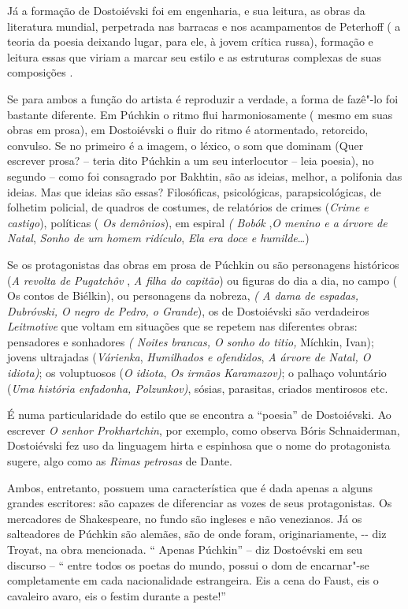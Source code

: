 Já a formação de Dostoiévski foi em engenharia, e sua leitura, as obras
da literatura mundial, perpetrada nas barracas e nos acampamentos de
Peterhoff ( a teoria da poesia deixando lugar, para ele, à jovem crítica
russa), formação e leitura essas que viriam a marcar seu estilo e as
estruturas complexas de suas composições .

Se para ambos a função do artista é reproduzir a verdade, a forma de
fazê"-lo foi bastante diferente. Em Púchkin o ritmo flui harmoniosamente
( mesmo em suas obras em prosa), em Dostoiévski o fluir do ritmo é
atormentado, retorcido, convulso. Se no primeiro é a imagem, o léxico, o
som que dominam (Quer escrever prosa? -- teria dito Púchkin a um seu
interlocutor -- leia poesia), no segundo -- como foi consagrado por
Bakhtin, são as ideias, melhor, a polifonia das ideias. Mas que ideias
são essas? Filosóficas, psicológicas, parapsicológicas, de folhetim
policial, de quadros de costumes, de relatórios de crimes (\emph{Crime e
castigo}), políticas ( \emph{Os demônios}), em espiral \emph{( Bobók}
,\emph{O menino e a árvore de Natal}, \emph{Sonho de um homem ridículo},
\emph{Ela era doce e humilde}\ldots{})

Se os protagonistas das obras em prosa de Púchkin ou são personagens
históricos (\emph{A revolta de Pugatchôv} , \emph{A filha do}
\emph{capitão}) ou figuras do dia a dia, no campo ( Os contos de
Biélkin), ou personagens da nobreza, \emph{( A dama de espadas,
Dubróvski, O negro de Pedro, o Grande}), os de Dostoiévski são
verdadeiros \emph{Leitmotive} que voltam em situações que se repetem nas
diferentes obras: pensadores e sonhadores \emph{( Noites brancas, O
sonho do titio,} Míchkin, Ivan); jovens ultrajadas (\emph{Várienka},
\emph{Humilhados e ofendidos}, \emph{A árvore de Natal, O idiota)}; os
voluptuosos (\emph{O idiota}, \emph{Os irmãos Karamazov)}; o palhaço
voluntário (\emph{Uma história enfadonha, Polzunkov)}, sósias,
parasitas, criados mentirosos etc.

É numa particularidade do estilo que se encontra a ``poesia'' de
Dostoiévski. Ao escrever \emph{O senhor Prokhartchin}, por exemplo, como
observa Bóris Schnaiderman, Dostoiévski fez uso da linguagem hirta e
espinhosa que o nome do protagonista sugere, algo como as \emph{Rimas
petrosas} de Dante.

Ambos, entretanto, possuem uma característica que é dada apenas a alguns
grandes escritores: são capazes de diferenciar as vozes de seus
protagonistas. Os mercadores de Shakespeare, no fundo são ingleses e não
venezianos. Já os salteadores de Púchkin são alemães, são de onde foram,
originariamente, -\/- diz Troyat, na obra mencionada. `` Apenas
Púchkin'' -- diz Dostoévski em seu discurso -- `` entre todos os poetas
do mundo, possui o dom de encarnar"-se completamente em cada
nacionalidade estrangeira. Eis a cena do Faust, eis o cavaleiro avaro,
eis o festim durante a peste!''

